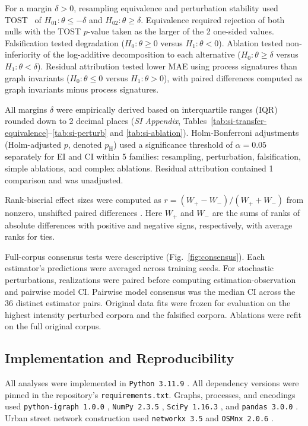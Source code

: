 \documentclass{article}
\begin{document}
For a margin $\delta > 0$, resampling equivalence and perturbation stability used TOST~\citep{ref47} of $H_{01}: \theta \le -\delta$ and $H_{02}: \theta \ge \delta$. Equivalence required rejection of both nulls with the TOST $p$-value taken as the larger of the 2 one-sided values. Falsification tested degradation ($H_0: \theta \ge 0$ versus $H_1: \theta < 0$). Ablation tested non-inferiority of the log-additive decomposition to each alternative \citep{ref78} ($H_0: \theta \ge \delta$ versus $H_1: \theta < \delta$). Residual attribution tested lower MAE using process signatures than graph invariants ($H_0: \theta \le 0$ versus $H_1: \theta > 0$), with paired differences computed as graph invariants minus process signatures.

All margins $\delta$ were empirically derived based on interquartile ranges (IQR) rounded down to 2 decimal places (\textit{SI Appendix}, Tables~\ref{tab:si-transfer-equivalence}--\ref{tab:si-perturb} and \ref{tab:si-ablation}). Holm-Bonferroni adjustments (Holm-adjusted $p$, denoted $p_{\mathrm H}$) \citep{ref46} used a significance threshold of $\alpha = 0.05$ separately for EI and CI within 5 families: resampling, perturbation, falsification, simple ablations, and complex ablations. Residual attribution contained 1 comparison and was unadjusted.

Rank-biserial effect sizes were computed as $r = (W_{+} - W_{-})/(W_{+} + W_{-})$ from nonzero, unshifted paired differences \citep{ref71}. Here $W_{+}$ and $W_{-}$ are the sums of ranks of absolute differences with positive and negative signs, respectively, with average ranks for ties.

Full-corpus consensus tests were descriptive (Fig.~\ref{fig:consensus}). Each estimator's predictions were averaged across training seeds. For stochastic perturbations, realizations were paired before computing estimation-observation and pairwise model CI. Pairwise model consensus was the median CI across the 36 distinct estimator pairs. Original data fits were frozen for evaluation on the highest intensity perturbed corpora and the falsified corpora. Ablations were refit on the full original corpus.

\subsection*{Implementation and Reproducibility}
\label{sub-sec:imp-rep}

All analyses were implemented in \texttt{Python 3.11.9} \citep{ref86,ref102}. All dependency versions were pinned in the repository's \texttt{requirements.txt}. Graphs, processes, and encodings used \texttt{python-igraph 1.0.0} \citep{ref48,ref93}, \texttt{NumPy 2.3.5} \citep{ref81,ref96}, \texttt{SciPy 1.16.3} \citep{ref82,ref97}, and \texttt{pandas 3.0.0} \citep{ref83,ref84}. Urban street network construction used \texttt{networkx 3.5} \citep{ref91,ref98} and \texttt{OSMnx 2.0.6} \citep{ref118,ref119}.
\end{document}
